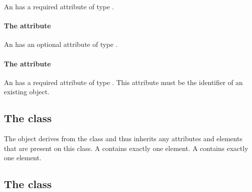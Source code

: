 An \AnalyticVolume has a required attribute  of type
.


\paragraph{The \fixttspace{} attribute}

An \AnalyticVolume has an optional attribute  of type
.


\paragraph{The \fixttspace{} attribute}

An \AnalyticVolume has a required attribute  of type
.
This attribute must be the identifier of an existing \DomainType object.


\subsection{The  class}
\label{parametricgeometry-class}




The \ParametricGeometry object derives from the \GeometryDefinition
class and thus inherits any attributes and elements that are present on
this class.
A \ParametricGeometry contains exactly one \SpatialPoints element.
A \ParametricGeometry contains exactly one \ListOfParametricObjects
element.
\subsection{The  class}
\label{listofparametricobjects-class}

